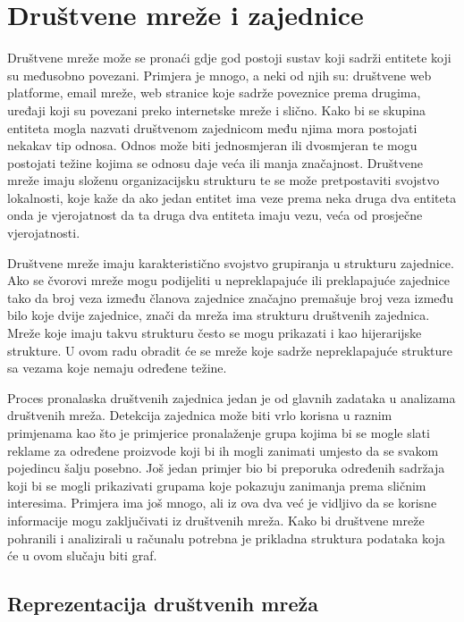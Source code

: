 \chapter{Društvene mreže i zajednice}

Društvene mreže može se pronaći gdje god postoji sustav koji sadrži entitete koji su međusobno povezani. Primjera je mnogo, a neki od njih su: društvene web platforme, email mreže, web stranice koje sadrže poveznice prema drugima, uređaji koji su povezani preko internetske mreže i slično. 
Kako bi se skupina entiteta mogla nazvati društvenom zajednicom među njima mora postojati nekakav tip odnosa. Odnos može biti jednosmjeran ili dvosmjeran te mogu postojati težine kojima se odnosu daje veća ili manja značajnost. Društvene mreže imaju složenu organizacijsku strukturu te se može pretpostaviti svojstvo lokalnosti, koje kaže da ako jedan entitet ima veze prema neka druga dva entiteta onda je vjerojatnost da ta druga dva entiteta imaju vezu, veća od prosječne vjerojatnosti. 

Društvene mreže imaju karakteristično svojstvo grupiranja u strukturu zajednice. Ako se čvorovi mreže mogu podijeliti u nepreklapajuće ili preklapajuće zajednice tako da broj veza između članova zajednice značajno premašuje broj veza između bilo koje dvije zajednice, znači da mreža ima strukturu društvenih zajednica. Mreže koje imaju takvu strukturu često se mogu prikazati i kao hijerarijske strukture. U ovom radu obradit će se mreže koje sadrže nepreklapajuće strukture sa vezama koje nemaju određene težine.

Proces pronalaska društvenih zajednica jedan je od glavnih zadataka u analizama društvenih mreža. Detekcija zajednica može biti vrlo korisna u raznim primjenama kao što je primjerice pronalaženje grupa kojima bi se mogle slati reklame za određene proizvode koji bi ih mogli zanimati umjesto da se svakom pojedincu šalju posebno. Još jedan primjer bio bi preporuka određenih sadržaja koji bi se mogli prikazivati grupama koje pokazuju zanimanja prema sličnim interesima. Primjera ima još mnogo, ali iz ova dva već je vidljivo da se korisne informacije mogu zaključivati iz društvenih mreža. Kako bi društvene mreže pohranili i analizirali u računalu potrebna je prikladna struktura podataka koja će u ovom slučaju biti graf.

\section{Reprezentacija društvenih mreža}


